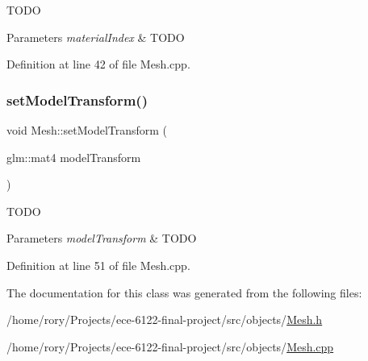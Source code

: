 T\+O\+DO 
\begin{DoxyParams}{Parameters}
{\em material\+Index} & T\+O\+DO \\
\hline
\end{DoxyParams}


Definition at line 42 of file Mesh.\+cpp.

\mbox{\label{class_mesh_a252f28d8a9fa95ff952ae400cfa44486}} 
\subsubsection{\texorpdfstring{set\+Model\+Transform()}{setModelTransform()}}
{\footnotesize\ttfamily void Mesh\+::set\+Model\+Transform (\begin{DoxyParamCaption}\item[{glm\+::mat4}]{model\+Transform }\end{DoxyParamCaption})}

T\+O\+DO 
\begin{DoxyParams}{Parameters}
{\em model\+Transform} & T\+O\+DO \\
\hline
\end{DoxyParams}


Definition at line 51 of file Mesh.\+cpp.



The documentation for this class was generated from the following files\+:\begin{DoxyCompactItemize}
\item 
/home/rory/\+Projects/ece-\/6122-\/final-\/project/src/objects/\hyperlink{_mesh_8h}{Mesh.\+h}\item 
/home/rory/\+Projects/ece-\/6122-\/final-\/project/src/objects/\hyperlink{_mesh_8cpp}{Mesh.\+cpp}\end{DoxyCompactItemize}
